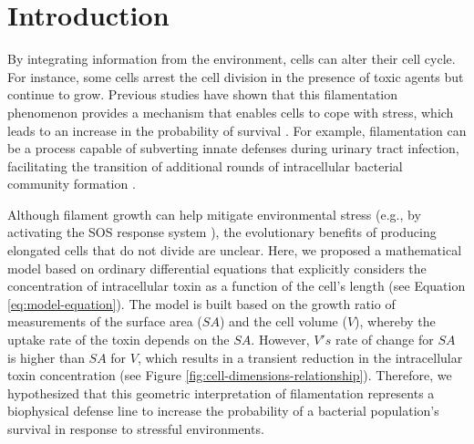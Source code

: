 \documentclass[a4paper, nobind]{templates/ociamthesis}
\begin{document}
\hypertarget{introduction-2}{%
\section{Introduction}\label{introduction-2}}

By integrating information from the environment, cells can alter their cell cycle.
For instance, some cells arrest the cell division in the presence of toxic agents but continue to grow.
Previous studies have shown that this filamentation phenomenon provides a mechanism that enables cells to cope with stress, which leads to an increase in the probability of survival \autocite{justiceMorphologicalPlasticityBacterial2008}.
For example, filamentation can be a process capable of subverting innate defenses during urinary tract infection, facilitating the transition of additional rounds of intracellular bacterial community formation \autocite{justiceFilamentationEscherichiaColi2006}.

Although filament growth can help mitigate environmental stress (e.g., by activating the SOS response system \autocite{justiceMorphologicalPlasticityBacterial2008}), the evolutionary benefits of producing elongated cells that do not divide are unclear.
Here, we proposed a mathematical model based on ordinary differential equations that explicitly considers the concentration of intracellular toxin as a function of the cell's length (see Equation \eqref{eq:model-equation}).
The model is built based on the growth ratio of measurements of the surface area (\(SA\)) and the cell volume (\(V\)), whereby the uptake rate of the toxin depends on the \(SA\).
However, \(V's\) rate of change for \(SA\) is higher than \(SA\) for \(V\), which results in a transient reduction in the intracellular toxin concentration (see Figure \ref{fig:cell-dimensions-relationship}).
Therefore, we hypothesized that this geometric interpretation of filamentation represents a biophysical defense line to increase the probability of a bacterial population's survival in response to stressful environments.
\end{document}
